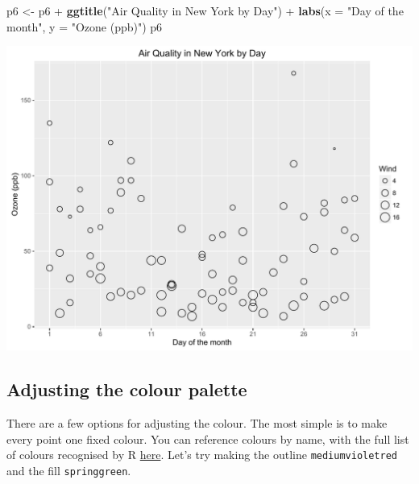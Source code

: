 \documentclass[]{article}
\newenvironment{Shaded}{\begin{snugshade}}{\end{snugshade}}
\newcommand{\KeywordTok}[1]{\textcolor[rgb]{0.13,0.29,0.53}{\textbf{{#1}}}}
\newcommand{\DataTypeTok}[1]{\textcolor[rgb]{0.13,0.29,0.53}{{#1}}}
\newcommand{\StringTok}[1]{\textcolor[rgb]{0.31,0.60,0.02}{{#1}}}
\newcommand{\NormalTok}[1]{{#1}}
\begin{document}
\begin{Shaded}
\begin{Highlighting}[]
\NormalTok{p6 <-}\StringTok{ }\NormalTok{p6 +}\StringTok{ }\KeywordTok{ggtitle}\NormalTok{(}\StringTok{"Air Quality in New York by Day"}\NormalTok{) +}\StringTok{ }
\StringTok{      }\KeywordTok{labs}\NormalTok{(}\DataTypeTok{x =} \StringTok{"Day of the month"}\NormalTok{, }\DataTypeTok{y =} \StringTok{"Ozone (ppb)"}\NormalTok{) }
\NormalTok{p6}
\end{Highlighting}
\end{Shaded}

\begin{center}\includegraphics{0_all_posts_pdf/wscatter_5-1} \end{center}

\subsection{Adjusting the colour
palette}\label{adjusting-the-colour-palette-1}

There are a few options for adjusting the colour. The most simple is to
make every point one fixed colour. You can reference colours by name,
with the full list of colours recognised by R
\href{http://www.stat.columbia.edu/~tzheng/files/Rcolor.pdf}{here}.
Let's try making the outline \texttt{mediumvioletred} and the fill
\texttt{springgreen}.
\end{document}
